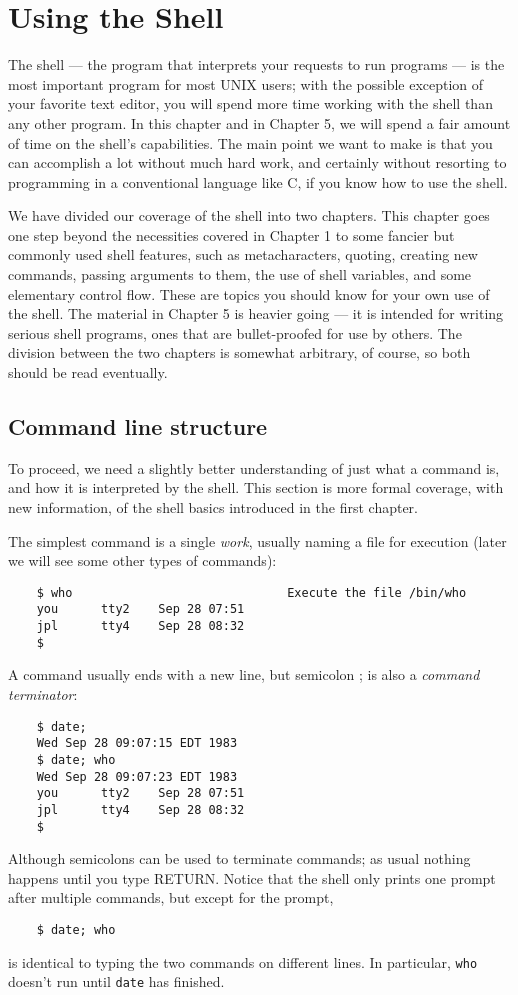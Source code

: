 \chapter{Using the Shell}

	The shell --- the program that interprets your requests to run programs --- is
the most important program for most UNIX users; with the possible exception of
your favorite text editor, you will spend more time working with the shell than
any other program. In this chapter and in Chapter 5, we will spend a fair
amount of time on the shell's capabilities. The main point we want to make is
that you can accomplish a lot without much hard work, and certainly without
resorting to programming in a conventional language like C, if you know how
to use the shell.

	We have divided our coverage of the shell into two chapters. This chapter
goes one step beyond the necessities covered in Chapter 1 to some fancier but
commonly used shell features, such as metacharacters, quoting, creating new
commands, passing arguments to them, the use of shell variables, and some
elementary control flow. These are topics you should know for your own use
of the shell. The material in Chapter 5 is heavier going --- it is intended for
writing serious shell programs, ones that are bullet-proofed for use by others.
The division between the two chapters is somewhat arbitrary, of course, so
both should be read eventually.

\section{Command line structure}

	To proceed, we need a slightly better understanding of just what a command
is, and how it is interpreted by the shell. This section is more formal
coverage, with new information, of the shell basics introduced in the first
chapter.

	The simplest command is a single \textit{work}, usually naming a file for execution
(later we will see some other types of commands):
\begin{verbatim}
    $ who                              Execute the file /bin/who
    you      tty2    Sep 28 07:51
    jpl      tty4    Sep 28 08:32
    $
\end{verbatim}
A command usually ends with a new line, but semicolon ; is also a \textit{command terminator}:
\begin{verbatim}
    $ date;
    Wed Sep 28 09:07:15 EDT 1983
    $ date; who
    Wed Sep 28 09:07:23 EDT 1983
    you      tty2    Sep 28 07:51
    jpl      tty4    Sep 28 08:32
    $	
\end{verbatim}
	Although semicolons can be used to terminate commands; as usual nothing
happens until you type RETURN. Notice that the shell only prints one prompt
after multiple commands, but except for the prompt,
\begin{verbatim}
    $ date; who
\end{verbatim}
is identical to typing the two commands on different lines. In particular, \verb=who=
doesn't run until \verb=date= has finished.

